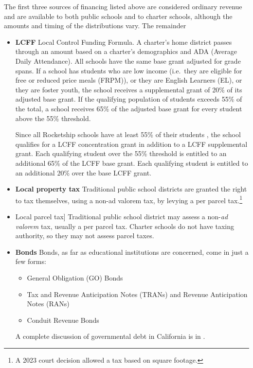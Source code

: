 The first three sources of financing listed above are considered ordinary revenue and are available to both public schools and to charter schools, although the amounts and timing of the distributions vary. The remainder 

\begin{itemize}
  \item \textbf{LCFF} Local Control Funding Formula. A charter's home district passes through an amount based on a charter's demographics and ADA (Average Daily Attendance). All schools have the same base grant adjusted for grade spans.  If a school has students who are low income (i.e.~they are eligible for free or reduced price meals (FRPM)), or they are English Learners (EL), or they are foster youth, the school receives a supplemental grant of 20\% of its adjusted base grant. If the qualifying population of students exceeds 55\% of the total, a school receives 65\% of the adjusted base grant for every student above the 55\% threshold.

Since all Rocketship schools have at least 55\% of their students , the school qualifies for a LCFF concentration grant in addition to a LCFF supplemental grant. Each qualifying student over the 55\% threshold is entitled to an additional 65\% of the LCFF base grant. Each qualifying student is entitled to an additional 20\% over the base LCFF grant.\\
    \item \textbf{Local property tax} Traditional public school districts are granted the right to tax themselves, using a non-ad valorem tax, by levying a per parcel tax.\footnote{A 2023 court decision allowed a tax based on square footage.}
  \item Local parcel tax] Traditional public school district may assess a non-\textit{ad valorem} tax, usually a per parcel tax. Charter schools do not have taxing authority, so they may not assess parcel taxes.
  \item \textbf{Bonds} Bonds, as far as educational institutions are concerned, come in just a few forms:
        \begin{itemize}
          \item General Obligation (GO) Bonds
          \item Tax and Revenue Anticipation Notes (TRANs) and Revenue Anticipation Notes (RANs)
          \item Conduit Revenue Bonds
        \end{itemize}
  A complete discussion of governmental debt in California is in \textcite{CDIAC2023}.
  

\end{itemize}
